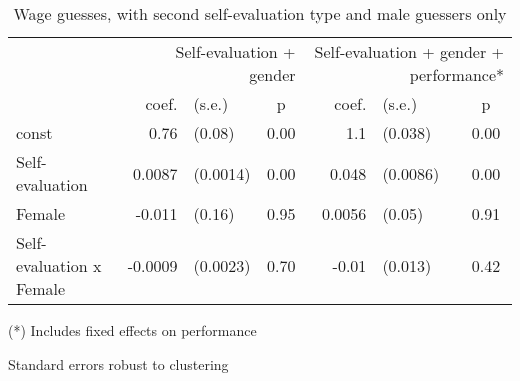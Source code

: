 \begin{table}
\centering
\caption{Wage guesses, with second self-evaluation type and male guessers only}
\begin{tabular}{lrlc|rlc}
\toprule
 & \multicolumn{3}{p{12em}}{Self-evaluation + gender} & \multicolumn{3}{p{12em}}{Self-evaluation + gender + performance*} \\
 & coef. & (s.e.) & p & coef. & (s.e.) & p \\
\midrule
const & 0.76 & (0.08) & 0.00 & 1.1 & (0.038) & 0.00 \\
Self-evaluation & 0.0087 & (0.0014) & 0.00 & 0.048 & (0.0086) & 0.00 \\
Female & -0.011 & (0.16) & 0.95 & 0.0056 & (0.05) & 0.91 \\
Self-evaluation x Female & -0.0009 & (0.0023) & 0.70 & -0.01 & (0.013) & 0.42 \\
\bottomrule
\end{tabular}
\end{table}


(*) Includes fixed effects on performance

Standard errors robust to clustering
